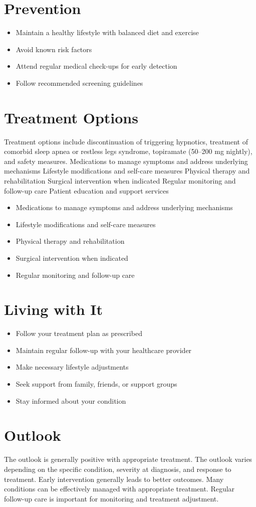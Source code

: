 \section{Prevention}
\begin{itemize}[noitemsep]
  \item Maintain a healthy lifestyle with balanced diet and exercise
  \item Avoid known risk factors
  \item Attend regular medical check-ups for early detection
  \item Follow recommended screening guidelines
\end{itemize}
\section{Treatment Options}
Treatment options include discontinuation of triggering hypnotics, treatment of comorbid sleep apnea or restless legs syndrome, topiramate (50--200 mg nightly), and safety measures. Medications to manage symptoms and address underlying mechanisms Lifestyle modifications and self-care measures Physical therapy and rehabilitation Surgical intervention when indicated Regular monitoring and follow-up care Patient education and support services

\begin{itemize}[noitemsep]
  \item Medications to manage symptoms and address underlying mechanisms
  \item Lifestyle modifications and self-care measures
  \item Physical therapy and rehabilitation
  \item Surgical intervention when indicated
  \item Regular monitoring and follow-up care
\end{itemize}
\section{Living with It}
\begin{itemize}[noitemsep]
  \item Follow your treatment plan as prescribed
  \item Maintain regular follow-up with your healthcare provider
  \item Make necessary lifestyle adjustments
  \item Seek support from family, friends, or support groups
  \item Stay informed about your condition
\end{itemize}
\section{Outlook}
The outlook is generally positive with appropriate treatment. The outlook varies depending on the specific condition, severity at diagnosis, and response to treatment. Early intervention generally leads to better outcomes. Many conditions can be effectively managed with appropriate treatment. Regular follow-up care is important for monitoring and treatment adjustment.

